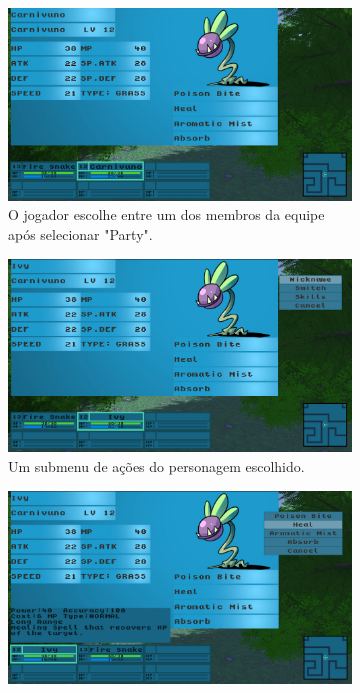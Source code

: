 \begin{figure}[h!]
  \centering
  \begin{subfigure}[b]{0.45\linewidth}
    \includegraphics[width=\linewidth]{status.jpg}
     \caption{O jogador escolhe entre um dos membros da equipe após selecionar "Party".}
  \end{subfigure}
  \begin{subfigure}[b]{0.45\linewidth}
    \includegraphics[width=\linewidth]{nickname.jpg}
    \caption{Um submenu de ações do personagem escolhido.}
  \end{subfigure}
  \begin{subfigure}[b]{0.45\linewidth}
    \includegraphics[width=\linewidth]{skills.jpg}

\end{subfigure}
\end{figure}
